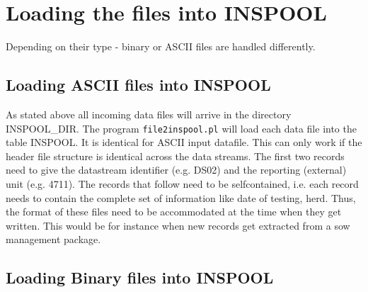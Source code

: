 \section{Loading the files into INSPOOL}

Depending on their type - binary or ASCII files are handled differently.


\subsection{Loading ASCII files into INSPOOL}

As stated above all incoming data files will arrive in the directory
INSPOOL\_DIR. The program \texttt{\small file2inspool.pl} will
load each data file into the table INSPOOL. It is identical for ASCII
input datafile. This can only work if the header file structure is
identical across the data streams. The first two records need to give
the datastream identifier (e.g. DS02) and the reporting (external)
unit (e.g. 4711). The records that follow need to be selfcontained,
i.e. each record needs to contain the complete set of information
like date of testing, herd. Thus, the format of these files need to
be accommodated at the time when they get written. This would be for
instance when new records get extracted from a sow management package.


\subsection{Loading Binary files into INSPOOL}

